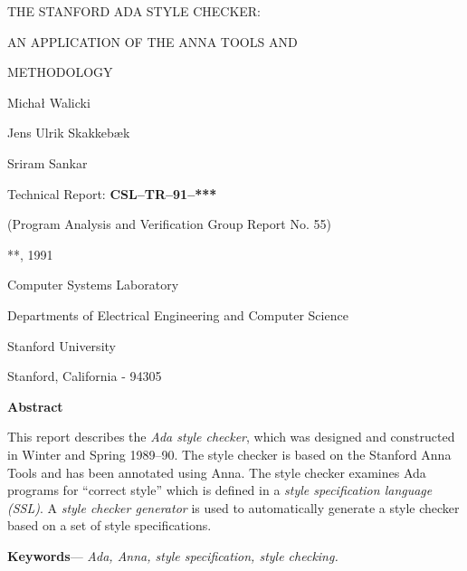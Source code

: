 
\setlength{\textwidth}{6.8in}
\setlength{\textheight}{8.7in}
\setlength{\topmargin}{-1in}
\setlength{\headheight}{0in}
\setlength{\headsep}{1in}
\setlength{\columnsep}{.3in}
\setlength{\oddsidemargin}{-0.15in}
\setlength{\parindent}{0pt}
\setlength{\parskip}{\medskipamount}



\def\thepage{}

\vspace*{1.6cm}

\begin{center}
{\Large\bf
\strut THE STANFORD ADA STYLE CHECKER:\\
\strut AN APPLICATION OF THE ANNA TOOLS AND\\
\strut METHODOLOGY}

\vspace{1.2cm}

{\large\bf
\strut Micha{\l} Walicki\\
\strut Jens Ulrik Skakkeb{\ae}k\\
\strut Sriram Sankar}

\vspace{1.2cm}

{\large Technical Report: {\bf CSL--TR--91--***}}

{\large (Program Analysis and Verification Group Report No. 55)}

\vspace{0.7cm}

{\large ***, 1991}

\vspace{0.7cm}

{\large
\strut Computer Systems Laboratory\\
\strut Departments of Electrical Engineering and Computer Science\\
\strut Stanford University\\
\strut Stanford, California - 94305}

\vspace{2cm}

{\large\bf Abstract}
\end{center}

This report describes the {\em Ada style checker}, which was designed
and constructed in Winter and Spring 1989--90. The style checker is
based on the Stanford Anna Tools and has been annotated using Anna.
The style checker examines Ada programs for ``correct style'' which is
defined in a {\em style specification language (SSL)}.
A {\it style checker generator} is used to automatically generate a
style checker based on a set of style specifications.

\vspace{10pt}

\noindent
{\bf Keywords}---{\it
Ada,
Anna,
style specification,
style checking.}


